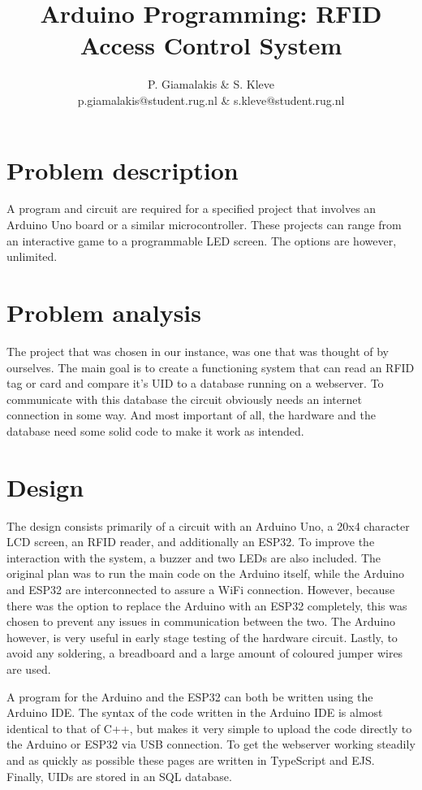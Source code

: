 \documentclass[a4paper,10pt]{article}
\title{Arduino Programming: RFID Access Control System}
\author{P. Giamalakis \& S. Kleve\\
        p.giamalakis@student.rug.nl \& s.kleve@student.rug.nl}
\begin{document}
\maketitle

\section{Problem description}
 A program and circuit are required for a specified project that involves an Arduino Uno board or a similar microcontroller.  These projects can range from an interactive game to a programmable LED screen. The options are however, unlimited.

\section{Problem analysis}
The project that was chosen in our instance, was one that was thought of by ourselves. The main goal is to create a functioning system that can read an RFID tag or card and compare it's UID to a database running on a webserver. To communicate with this database the circuit obviously needs an internet connection in some way. And most important of all, the hardware and the database need some solid code to make it work as intended.

\section{Design}
The design consists primarily of a circuit with an Arduino Uno, a 20x4 character LCD screen, an RFID reader, and additionally an ESP32. To improve the interaction with the system, a buzzer and two LEDs are also included. The original plan was to run the main code on the Arduino itself, while the Arduino and ESP32 are interconnected to assure a WiFi connection. However, because there was the option to replace the Arduino with an ESP32 completely, this was chosen to prevent any issues in communication between the two. The Arduino however, is very useful in early stage testing of the hardware circuit. Lastly, to avoid any soldering, a breadboard and a large amount of coloured jumper wires are used.

A program for the Arduino and the ESP32 can both be written using the Arduino IDE. The syntax of the code written in the Arduino IDE is almost identical to that of C++, but makes it very simple to upload the code directly to the Arduino or ESP32 via USB connection. To get the webserver working steadily and as quickly as possible these pages are written in TypeScript and EJS. Finally, UIDs are stored in an SQL database.
\end{document}
